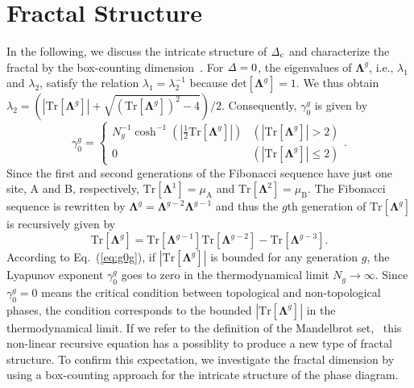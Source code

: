 \documentclass[%
superscriptaddress,
preprint,
amsmath,amssymb,
]{revtex4-1}
\newcommand{\lt}{\left}
\newcommand{\rt}{\right}
\newcommand{\mrm}{\mathrm}
\newcommand{\mbf}{\mathbf}
\begin{document}
\section{Fractal Structure}
In the following, we discuss the intricate structure of ${\it\Delta}_{\mrm{c}}$ and characterize the fractal by the box-counting dimension~\cite{Mandelbrot77}.
For ${\it\Delta}=0$, the eigenvalues of $\mbf{\Lambda}^g$, i.e., $\lambda_1$ and $\lambda_2$, satisfy the relation $\lambda_1=\lambda_2^{-1}$ because $\mrm{det}[\mbf{\Lambda}^g]=1$. We thus obtain $\lambda_2=\left(|\mrm{Tr}[\mbf{\Lambda}^g]|+\sqrt{(\mrm{Tr}[\mbf{\Lambda}^g])^2-4}\right)/2$. 
Consequently, $\gamma_0^g$ is given by
\begin{equation}
\gamma_0^g=\left\{\begin{matrix}
N_g^{-1}\cosh^{-1} (|\frac{1}{2}\mrm{Tr}[\mbf{\Lambda}^g]|) & \lt(|\mrm{Tr}[\mbf{\Lambda}^g]|> 2\rt)\\
0 & \lt(|\mrm{Tr}[\mbf{\Lambda}^g]|\le 2\rt)
\end{matrix}\right. .
\label{eq:g0g}
\end{equation}
Since the first and second generations of the Fibonacci sequence have just one site, A and B, respectively, $\mrm{Tr}[\mbf{\Lambda}^1]=\mu_{\mrm{A}}$ and $\mrm{Tr}[\mbf{\Lambda}^2]=\mu_{\mrm{B}}$.
The Fibonacci sequence is rewritten by $\mbf{\Lambda}^g=\mbf{\Lambda}^{g-2}\mbf{\Lambda}^{g-1}$ and thus the $g$th generation of $\mrm{Tr}[\mbf{\Lambda}^g]$ is recursively given by
\begin{equation}
\mrm{Tr}[\mbf{\Lambda}^g]=\mrm{Tr}[\mbf{\Lambda}^{g-1}]\mrm{Tr}[\mbf{\Lambda}^{g-2}]-\mrm{Tr}[\mbf{\Lambda}^{g-3}].
\label{eq:req}
\end{equation}
According to Eq.~(\ref{eq:g0g}), if $|\mrm{Tr}[\mbf{\Lambda}^g]|$ is bounded for any generation $g$, the Lyapunov exponent $\gamma_0^g$ goes to zero in the thermodynamical limit $N_g\to\infty$.
Since $\gamma_0^g=0$ means the critical condition between topological and non-topological phases, the condition corresponds to the bounded $|\mrm{Tr}[\mbf{\Lambda}^g]|$ in the thermodynamical limit.  
If we refer to the definition of the Mandelbrot set,~\cite{Mandelbrot77,note3} this non-linear recursive equation has a possiblity to produce a new type of fractal structure.
To confirm this expectation, we investigate the fractal dimension by using a box-counting approach for the intricate structure of the phase diagram.
\end{document}
